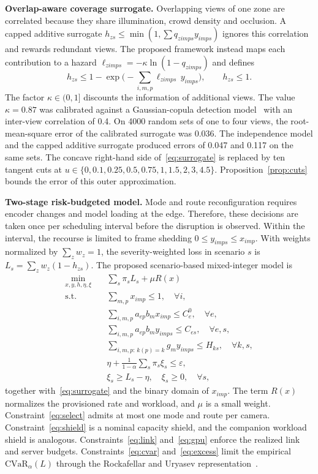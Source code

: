 \documentclass[letterpaper,journal]{IEEEtran}
\begin{document}
\textbf{Overlap-aware coverage surrogate.} Overlapping views of one zone are correlated because they share illumination, crowd density and occlusion. A capped additive surrogate $h_{zs}\le\min(1,\sum q_{zimps}y_{imps})$ ignores this correlation and rewards redundant views. The proposed framework instead maps each contribution to a hazard $\ell_{zimps}=-\kappa\ln(1-q_{zimps})$ and defines
\begin{equation}
h_{zs}\le 1-\exp\!\Big(-\textstyle\sum_{i,m,p}\ell_{zimps}\,y_{imps}\Big),\qquad h_{zs}\le 1.
\label{eq:surrogate}
\end{equation}
The factor $\kappa\in(0,1]$ discounts the information of additional views. The value $\kappa=0.87$ was calibrated against a Gaussian-copula detection model~\cite{nelsen2006copulas} with an inter-view correlation of 0.4. On 4000 random sets of one to four views, the root-mean-square error of the calibrated surrogate was 0.036. The independence model and the capped additive surrogate produced errors of 0.047 and 0.117 on the same sets. The concave right-hand side of~\eqref{eq:surrogate} is replaced by ten tangent cuts at $u\in\{0,0.1,0.25,0.5,0.75,1,1.5,2,3,4.5\}$. Proposition~\ref{prop:cuts} bounds the error of this outer approximation.

\textbf{Two-stage risk-budgeted model.} Mode and route reconfiguration requires encoder changes and model loading at the edge. Therefore, these decisions are taken once per scheduling interval before the disruption is observed. Within the interval, the recourse is limited to frame shedding $0\le y_{imps}\le x_{imp}$. With weights normalized by $\sum_z w_z=1$, the severity-weighted loss in scenario $s$ is $L_s=\sum_{z}w_z(1-h_{zs})$. The proposed scenario-based mixed-integer model is
\begin{align}
\min_{x,y,h,\eta,\xi}\quad & \textstyle\sum_s \pi_s L_s+\mu R(x) \label{eq:obj}\\
\mathrm{s.t.}\quad
&\textstyle\sum_{m,p}x_{imp}\le1, \quad \forall i,\label{eq:select}\\
&\textstyle\sum_{i,m,p}a_{ep}b_{m}x_{imp}\le C_{e}^{0},\quad \forall e,\label{eq:shield}\\
&\textstyle\sum_{i,m,p}a_{ep}b_{m}y_{imps}\le C_{es},\quad \forall e,s,\label{eq:link}\\
&\textstyle\sum_{i,m,p:\,k(p)=k}g_{m}y_{imps}\le H_{ks},\quad \forall k,s,\label{eq:gpu}\\
&\eta+\frac{1}{1-\alpha}\textstyle\sum_s\pi_s\xi_s\le\varepsilon,\label{eq:cvar}\\
&\xi_s\ge L_s-\eta,\quad \xi_s\ge0,\quad \forall s,\label{eq:excess}
\end{align}
together with~\eqref{eq:surrogate} and the binary domain of $x_{imp}$. The term $R(x)$ normalizes the provisioned rate and workload, and $\mu$ is a small weight. Constraint~\eqref{eq:select} admits at most one mode and route per camera. Constraint~\eqref{eq:shield} is a nominal capacity shield, and the companion workload shield is analogous. Constraints~\eqref{eq:link} and~\eqref{eq:gpu} enforce the realized link and server budgets. Constraints~\eqref{eq:cvar} and~\eqref{eq:excess} limit the empirical $\mathrm{CVaR}_{\alpha}(L)$ through the Rockafellar and Uryasev representation~\cite{rockafellar2000}.
\end{document}
